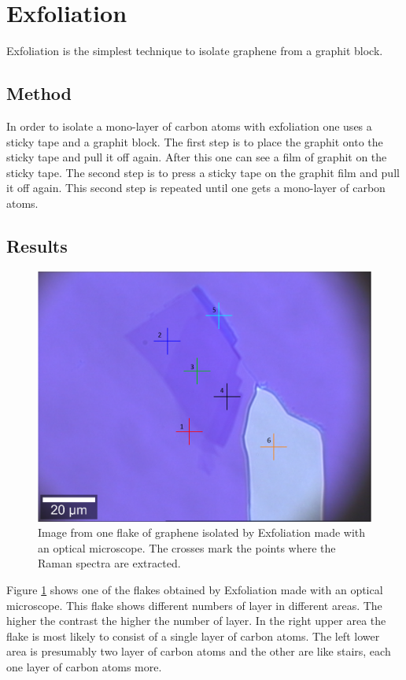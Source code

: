 \documentclass[12pt,a4paper]{article}
\begin{document}
\section{Exfoliation}
\label{sec:3}
Exfoliation is the simplest technique to isolate graphene from a graphit block.

\subsection{Method}
In order to isolate a mono-layer of carbon atoms with exfoliation one uses a sticky tape and a graphit block. The first step is to place the graphit onto the sticky tape and pull it off again. After this one can see a film of graphit on the sticky tape. The second step is to press a sticky tape on the graphit film and pull it off again. This second step is repeated until one gets a mono-layer of carbon atoms.

\subsection{Results}

\begin{figure}[h]
\centering
\includegraphics[scale=0.35]{Bilder/Exfoliation/mono_bi_tri_flake.PNG}
\caption{Image from one flake of graphene isolated by Exfoliation made with an optical microscope. The crosses mark the points where the Raman spectra are extracted.}
\label{fig:Exfoliation_Microscope}
\end{figure}

Figure \ref{fig:Exfoliation_Microscope} shows one of the flakes obtained by Exfoliation made with an optical microscope. This flake shows different numbers of layer in different areas. The higher the contrast the higher the number of layer. In the right upper area the flake is most likely to consist of a single layer of carbon atoms. The left lower area is presumably two layer of carbon atoms and the other are like stairs, each one layer of carbon atoms more.
\end{document}
